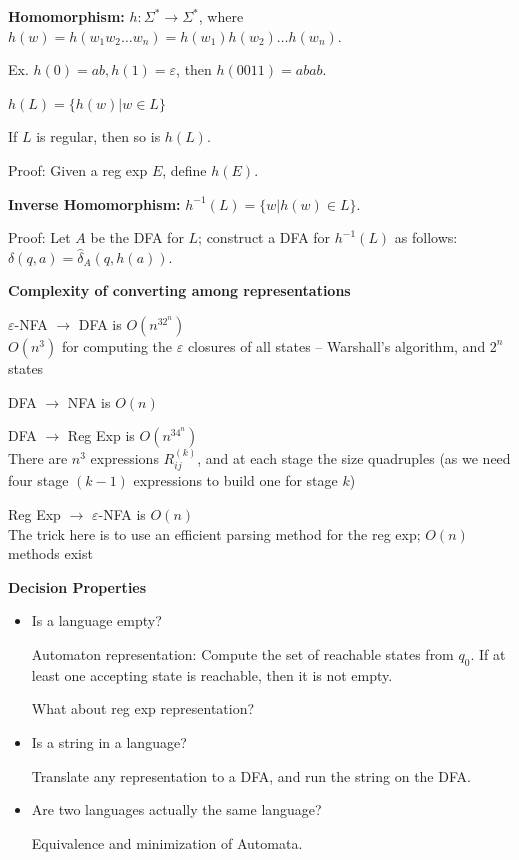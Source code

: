 \begin{frame}

{\bf Homomorphism:} $h:\Sigma^*\longrightarrow\Sigma^*$, where
$h(w)=h(w_1w_2\ldots w_n)=h(w_1)h(w_2)\ldots h(w_n)$.

Ex. $h(0)=ab,h(1)=\varepsilon$, then $h(0011)=abab$.

$h(L)=\{h(w)|w\in L\}$

If $L$ is regular, then so is $h(L)$.

Proof:  Given a reg exp $E$, define $h(E)$.

{\bf Inverse Homomorphism:} $h^{-1}(L)=\{w|h(w)\in L\}$.

Proof:  Let $A$ be the DFA for $L$; construct a DFA for $h^{-1}(L)$ as
follows: $\delta(q,a)=\hat\delta_A(q,h(a))$.
\end{frame}

\begin{frame}

{\bf Complexity of converting among representations}

$\varepsilon$-NFA $\longrightarrow$ DFA is $O(n^32^n)$ \\
$O(n^3)$ for computing the $\varepsilon$ closures of all states --
Warshall's algorithm, and $2^n$ states

DFA $\longrightarrow$ NFA is $O(n)$ 

DFA $\longrightarrow$ Reg Exp  is $O(n^34^n)$ \\
There are $n^3$ expressions $R_{ij}^{(k)}$, and at each stage the size
quadruples (as we need four stage $(k-1)$ expressions to build one for
stage $k$)

Reg Exp $\longrightarrow$ $\varepsilon$-NFA is $O(n)$ \\
The trick here is to use an efficient parsing method for the reg exp;
$O(n)$ methods exist
\end{frame}

\begin{frame}

{\bf Decision Properties}

\begin{itemize}
\item  Is a language empty?

Automaton representation: Compute the set of reachable states from
$q_0$.  If at least one accepting state is reachable, then it is not
empty.

What about reg exp representation?

\item  Is a string in a language?

Translate any representation to a DFA, and run the string on the DFA.

\item  Are two languages actually the same language?

Equivalence and minimization of Automata.
\end{itemize}
\end{frame}


